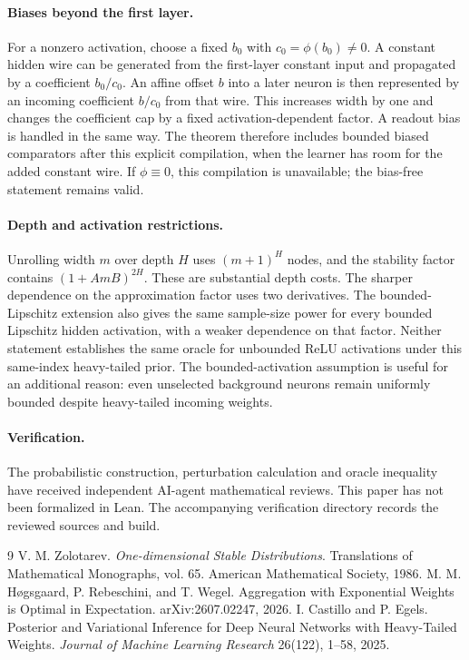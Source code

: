 \documentclass[11pt]{article}
\theoremstyle{remark}\newtheorem{remark}[theorem]{Remark}
\begin{document}
\paragraph{Biases beyond the first layer.}
For a nonzero activation, choose a fixed $b_0$ with $c_0=\phi(b_0)\ne0$. A constant hidden wire can be generated from the first-layer constant input and propagated by a coefficient $b_0/c_0$. An affine offset $b$ into a later neuron is then represented by an incoming coefficient $b/c_0$ from that wire. This increases width by one and changes the coefficient cap by a fixed activation-dependent factor. A readout bias is handled in the same way. The theorem therefore includes bounded biased comparators after this explicit compilation, when the learner has room for the added constant wire. If $\phi\equiv0$, this compilation is unavailable; the bias-free statement remains valid.

\paragraph{Depth and activation restrictions.}
Unrolling width $m$ over depth $H$ uses $(m+1)^H$ nodes, and the stability factor contains $(1+AmB)^{2H}$. These are substantial depth costs. The sharper dependence on the approximation factor uses two derivatives. The bounded-Lipschitz extension also gives the same sample-size power for every bounded Lipschitz hidden activation, with a weaker dependence on that factor. Neither statement establishes the same oracle for unbounded ReLU activations under this same-index heavy-tailed prior. The bounded-activation assumption is useful for an additional reason: even unselected background neurons remain uniformly bounded despite heavy-tailed incoming weights.

\paragraph{Verification.}
The probabilistic construction, perturbation calculation and oracle inequality have received independent AI-agent mathematical reviews. This paper has not been formalized in Lean. The accompanying verification directory records the reviewed sources and build.
\begin{thebibliography}{9}
 V. M. Zolotarev. \emph{One-dimensional Stable Distributions}. Translations of Mathematical Monographs, vol. 65. American Mathematical Society, 1986.
 M. M. H\o gsgaard, P. Rebeschini, and T. Wegel. Aggregation with Exponential Weights is Optimal in Expectation. arXiv:2607.02247, 2026.
 I. Castillo and P. Egels. Posterior and Variational Inference for Deep Neural Networks with Heavy-Tailed Weights. \emph{Journal of Machine Learning Research} 26(122), 1--58, 2025.
\end{thebibliography}
\end{document}
